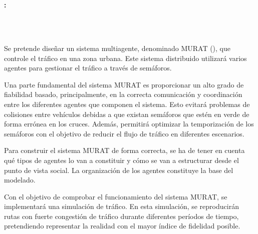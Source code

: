 \chapter*{}

\thispagestyle{empty}

\begin{center}
   {\large\bfseries \myTitleShort: \myTitle}
\end{center}

\begin{center}
    {\myName}
\end{center}

\\

    \vspace{0.7cm}

\\

Se pretende diseñar un sistema multiagente, denominado MURAT (\myTitle), que controle el tráfico en una zona urbana. Este sistema distribuido utilizará varios agentes para gestionar el tráfico a través de semáforos. 

Una parte fundamental del sistema MURAT es proporcionar un alto grado de fiabilidad basado, principalmente, en la correcta comunicación y coordinación entre los diferentes agentes que componen el sistema. Esto evitará problemas de colisiones entre vehículos debidas a que existan semáforos que estén en verde de forma errónea en los cruces. Además, permitirá optimizar la temporización de los semáforos con el objetivo de reducir el flujo de tráfico en diferentes escenarios.

Para construir el sistema MURAT de forma correcta, se ha de tener en cuenta qué tipos de agentes lo van a constituir y cómo se van a estructurar desde el punto de vista social. La organización de los agentes constituye la base del modelado.

Con el objetivo de comprobar el funcionamiento del sistema MURAT, se implementará una simulación de tráfico. En esta simulación, se reproducirán rutas con fuerte congestión de tráfico durante diferentes períodos de tiempo, pretendiendo representar la realidad con el mayor índice de fidelidad posible.

